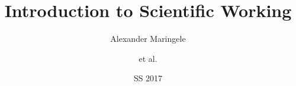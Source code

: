 \documentclass[%
]{beamer}
\begin{document}
\title{Introduction to Scientific Working}
\author[AxM]{Alexander Maringele\and et al.}
\date{SS 2017}

\titleframe

%



%  
% 
% 
% 

% 
% 
% 
% 
% 
% 
% 
% 
% 


% 
% 
\end{document}
